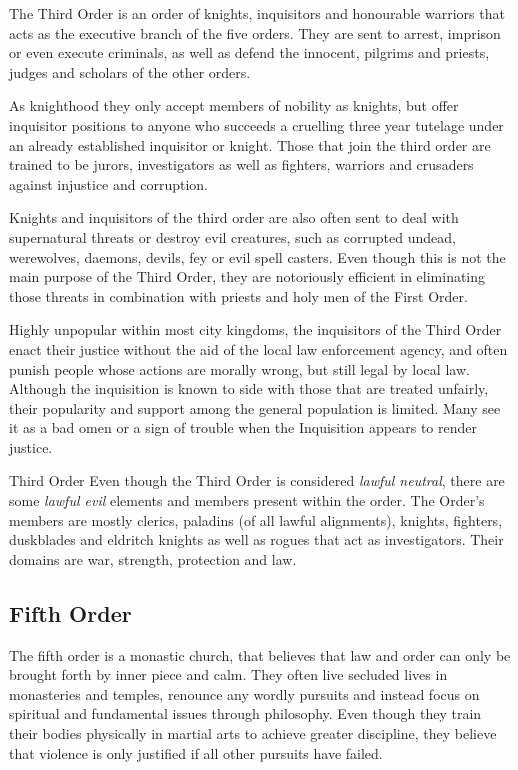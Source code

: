 The Third Order is an order of knights, inquisitors and honourable warriors
that acts as the executive branch of the five orders. They are sent to arrest,
imprison or even execute criminals, as well as defend the innocent, pilgrims
and priests, judges and scholars of the other orders.

As knighthood they only accept members of nobility as knights, but offer
inquisitor positions to anyone who succeeds a cruelling three year tutelage
under an already established inquisitor or knight. Those that join the third
order are trained to be jurors, investigators as well as fighters, warriors and
crusaders against injustice and corruption.

Knights and inquisitors of the third order are also often sent to deal with
supernatural threats or destroy evil creatures, such as corrupted undead,
werewolves, daemons, devils, fey or evil spell casters. Even though this is
not the main purpose of the Third Order, they are notoriously efficient in
eliminating those threats in combination with priests and holy men of the
First Order.

Highly unpopular within most city kingdoms, the inquisitors of the Third Order
enact their justice without the aid of the local law enforcement agency, and
often punish people whose actions are morally wrong, but still legal by local
law. Although the inquisition is known to side with those that are treated
unfairly, their popularity and support among the general population is
limited. Many see it as a bad omen or a sign of trouble when the Inquisition
appears to render justice.

\begin{35e}{Third Order}
  Even though the Third Order is considered \emph{lawful neutral}, there are
  some \emph{lawful evil} elements and members present within the order. The
  Order's members are mostly clerics, paladins (of all lawful alignments),
  knights, fighters, duskblades and eldritch knights as well as rogues that
  act as investigators. Their domains are war, strength, protection and law.
\end{35e}

\subsection{Fifth Order}
\label{sec:Fifth Order}

The fifth order is a monastic church, that believes that law and order can only
be brought forth by inner piece and calm. They often live secluded lives in
monasteries and temples, renounce any wordly pursuits and instead focus on
spiritual and fundamental issues through philosophy. Even though they train
their bodies physically in martial arts to achieve greater discipline, they
believe that violence is only justified if all other pursuits have failed.

